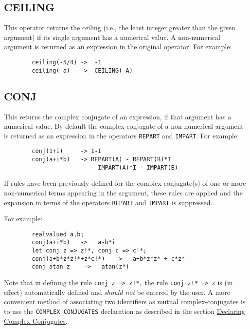 \subsection{CEILING}
\hypertarget{operator:CEILING}{}
This operator returns the ceiling (i.e., the least integer greater than
the given argument) if its single argument has a numerical value.  A
non-numerical argument is returned as an expression in the original
operator.  For example:

\begin{verbatim}
        ceiling(-5/4) ->  -1
        ceiling(-a)   ->  CEILING(-A)
\end{verbatim}

\subsection{CONJ}
\hypertarget{operator:CONJ}{}
This returns the complex conjugate
of an expression, if that argument has a numerical value.  By default the
complex conjugate of a non-numerical argument is returned as an expression
in the operators
\texttt{REPART} and \texttt{IMPART}.
For example:
\begin{verbatim}
        conj(1+i)     -> 1-I
        conj(a+i*b)   -> REPART(A) - REPART(B)*I
                         - IMPART(A)*I - IMPART(B)
\end{verbatim}

If rules have been previously defined for the complex conjugate(s)
of one or more non-numerical terms appearing in the argument, these rules are
applied and the expansion in terms of the operators
\texttt{REPART} and \texttt{IMPART} is
suppressed.

For example:
\begin{verbatim}
        realvalued a,b;
        conj(a+i*b)   ->   a-b*i
        let conj z => z!*, conj c => c!*;
        conj(a+b*z*z!*+z*c!*)   ->   a+b*z*z* + c*z*
        conj atan z    ->   atan(z*)
\end{verbatim}

Note that in defining the rule \texttt{conj z => z!*},\ the rule
\texttt{conj z!*  => z} is (in effect) automatically defined and
\emph{should not} be entered by the user.  A more convenient method of
associating two identifiers as mutual complex-conjugates is to use the
\texttt{COMPLEX\_CONJUGATES} declaration as described in the section
\hyperlink{command:COMPLEX_CONJUGATES}{Declaring Complex Conjugates}.

